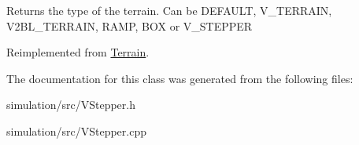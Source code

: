 \begin{DoxyReturn}{Returns}
the type of the terrain. Can be D\+E\+F\+A\+U\+LT, V\+\_\+\+T\+E\+R\+R\+A\+IN, V2\+B\+L\+\_\+\+T\+E\+R\+R\+A\+IN, R\+A\+MP, B\+OX or V\+\_\+\+S\+T\+E\+P\+P\+ER 
\end{DoxyReturn}


Reimplemented from \mbox{\hyperlink{class_terrain_a6cd1220b8e64466cc7a2219efff4141b}{Terrain}}.



The documentation for this class was generated from the following files\+:\begin{DoxyCompactItemize}
\item 
simulation/src/V\+Stepper.\+h\item 
simulation/src/V\+Stepper.\+cpp\end{DoxyCompactItemize}
